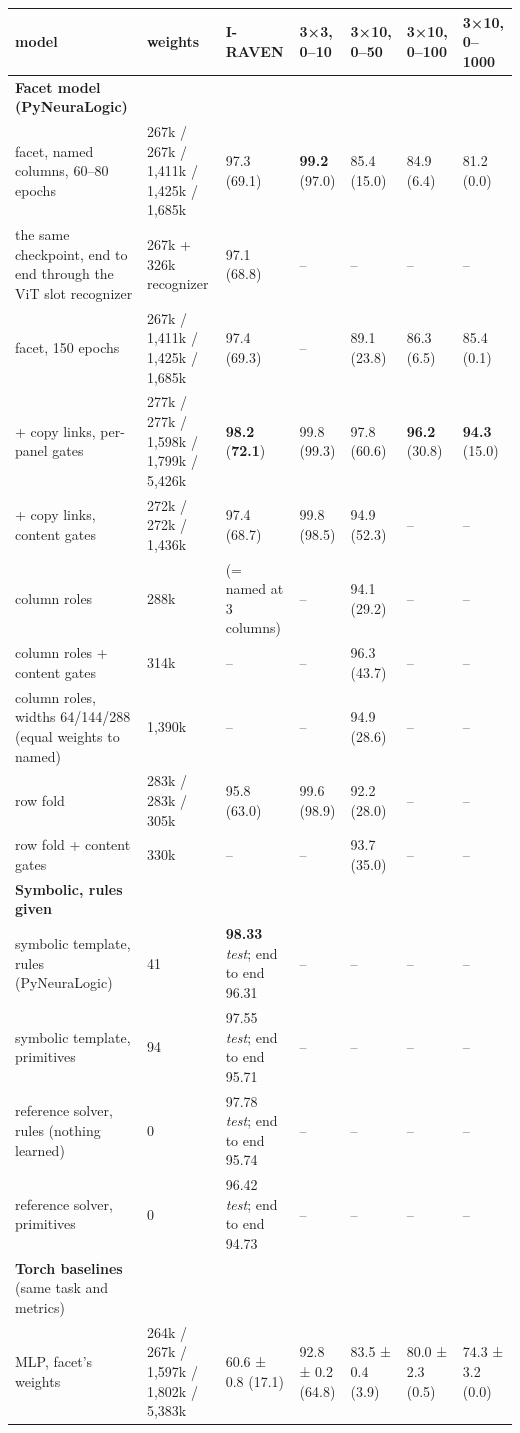 {\small
\begin{xltabular}{\linewidth}{@{}YYYlYll@{}}
\toprule
model & weights & I-RAVEN & 3×3, 0–10 & 3×10, 0–50 & 3×10, 0–100 & 3×10, 0–1000 \\
\midrule
\endhead
\textbf{Facet model (PyNeuraLogic)} &  &  &  &  &  &  \\
facet, named columns, 60–80 epochs & 267k / 267k / 1,411k / 1,425k / 1,685k & 97.3 (69.1) & \textbf{99.2} (97.0) & 85.4 (15.0) & 84.9 (6.4) & 81.2 (0.0) \\
the same checkpoint, end to end through the ViT slot recognizer & 267k + 326k recognizer & 97.1 (68.8) & – & – & – & – \\
facet, 150 epochs & 267k / 1,411k / 1,425k / 1,685k & 97.4 (69.3) & – & 89.1 (23.8) & 86.3 (6.5) & 85.4 (0.1) \\
+ copy links, per-panel gates & 277k / 277k / 1,598k / 1,799k / 5,426k & \textbf{98.2} (\textbf{72.1}) & 99.8 (99.3) & 97.8 (60.6) & \textbf{96.2} (30.8) & \textbf{94.3} (15.0) \\
+ copy links, content gates & 272k / 272k / 1,436k & 97.4 (68.7) & 99.8 (98.5) & 94.9 (52.3) & – & – \\
column roles & 288k & (= named at 3 columns) & – & 94.1 (29.2) & – & – \\
column roles + content gates & 314k & – & – & 96.3 (43.7) & – & – \\
column roles, widths 64/144/288 (equal weights to named) & 1,390k & – & – & 94.9 (28.6) & – & – \\
row fold & 283k / 283k / 305k & 95.8 (63.0) & 99.6 (98.9) & 92.2 (28.0) & – & – \\
row fold + content gates & 330k & – & – & 93.7 (35.0) & – & – \\
\textbf{Symbolic, rules given} &  &  &  &  &  &  \\
symbolic template, rules (PyNeuraLogic) & 41 & \textbf{98.33} \emph{test}; end to end 96.31 & – & – & – & – \\
symbolic template, primitives & 94 & 97.55 \emph{test}; end to end 95.71 & – & – & – & – \\
reference solver, rules (nothing learned) & 0 & 97.78 \emph{test}; end to end 95.74 & – & – & – & – \\
reference solver, primitives & 0 & 96.42 \emph{test}; end to end 94.73 & – & – & – & – \\
\textbf{Torch baselines} (same task and metrics) &  &  &  &  &  &  \\
MLP, facet's weights & 264k / 267k / 1,597k / 1,802k / 5,383k & 60.6 ± 0.8 (17.1) & 92.8 ± 0.2 (64.8) & 83.5 ± 0.4 (3.9) & 80.0 ± 2.3 (0.5) & 74.3 ± 3.2 (0.0) \\

\end{xltabular}}
